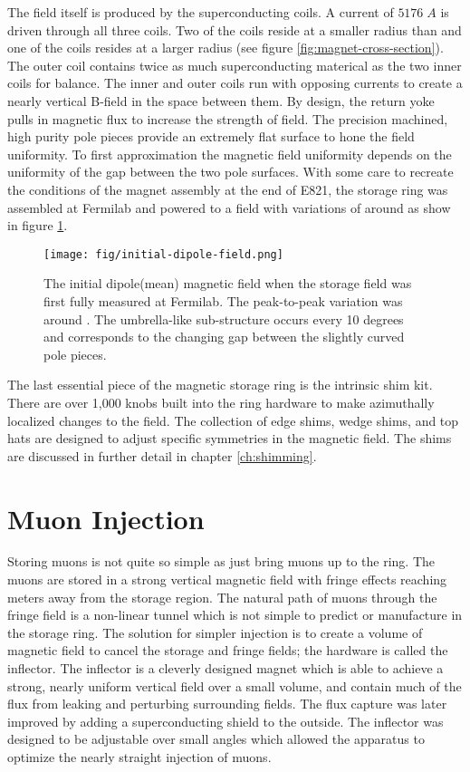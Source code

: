 The field itself is produced by the superconducting coils.  A current of $5176\;A$ is driven through all three coils.  Two of the coils reside at a smaller radius than \rmagic and one of the coils resides at a larger radius (see figure \ref{fig:magnet-cross-section}).  The outer coil contains twice as much superconducting materical as the two inner coils for balance.  The inner and outer coils run with opposing currents to create a nearly vertical B-field in the space between them.  By design, the return yoke pulls in magnetic flux to increase the strength of field.  The precision machined, high purity pole pieces provide an extremely flat surface to hone the field uniformity.  To first approximation the magnetic field uniformity depends on the uniformity of the gap between the two pole surfaces.  With some care to recreate the conditions of the magnet assembly at the end of E821, the storage ring was assembled at Fermilab and powered to a field with variations of around  as show in figure \ref{fig:initial-field}.

\begin{figure}
\texttt{[image: fig/initial-dipole-field.png]}
\caption{The initial dipole(mean) magnetic field when the storage field was first fully measured at Fermilab.  The peak-to-peak variation was around .  The umbrella-like sub-structure occurs every 10 degrees and corresponds to the changing gap between the slightly curved pole pieces.}
\label{fig:initial-field}
\end{figure}

The last essential piece of the magnetic storage ring is the intrinsic shim kit.  There are over 1,000 knobs built into the ring hardware to make azimuthally localized changes to the field. The collection of edge shims, wedge shims, and top hats are designed to adjust specific symmetries in the magnetic field.  The shims are discussed in further detail in chapter \ref{ch:shimming}.

\section{Muon Injection} \label{sec:muon-injection}

Storing muons is not quite so simple as just bring muons up to the ring.  The muons are stored in a strong vertical magnetic field with fringe effects reaching meters away from the storage region.  The natural path of muons through the fringe field is a non-linear tunnel which is not simple to predict or manufacture in the storage ring.  The solution for simpler injection is to create a volume of magnetic field to cancel the storage and fringe fields; the hardware is called the inflector.  The inflector is a cleverly designed magnet which is able to achieve a strong, nearly uniform vertical field over a small volume, and contain much of the flux from leaking and perturbing surrounding fields.  The flux capture was later improved by adding a superconducting shield to the outside.  The inflector was designed to be adjustable over small angles which allowed the apparatus to optimize the nearly straight injection of muons.\cite{e821-prd}


